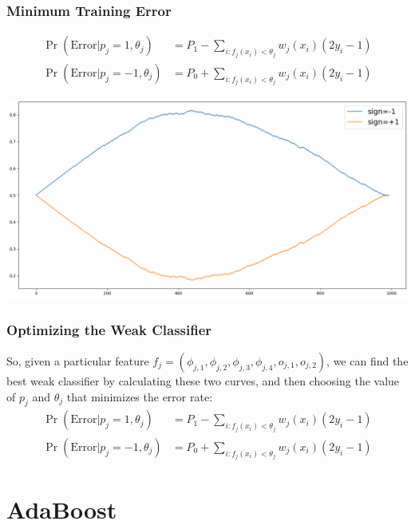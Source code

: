 \documentclass{beamer}
\begin{document}
\begin{frame}
  \frametitle{Minimum Training Error}
  \begin{align*}
    \Pr(\text{Error}|p_j=1,\theta_j) &=P_1-\sum_{i:f_j(x_i)<\theta_j} w_j(x_i)(2y_i-1)\\
    \Pr(\text{Error}|p_j=-1,\theta_j) &=P_0+\sum_{i:f_j(x_i)<\theta_j} w_j(x_i)(2y_i-1)
  \end{align*}
  \centerline{\includegraphics[height=0.5\textheight]{figs/errorplus_errorminus.png}}
\end{frame}

\begin{frame}
  \frametitle{Optimizing the Weak Classifier}

  So, given a particular feature
  $f_j=(\phi_{j,1},\phi_{j,2},\phi_{j,3},\phi_{j,4},o_{j,1},o_{j,2})$,
  we can find the best weak classifier by calculating these two
  curves, and then choosing the value of $p_j$ and $\theta_j$ that
  minimizes the error rate:
  \begin{align*}
    \Pr(\text{Error}|p_j=1,\theta_j) &= P_1-\sum_{i:f_j(x_i)<\theta_j} w_j(x_i)(2y_i-1)\\
    \Pr(\text{Error}|p_j=-1,\theta_j) &= P_0+\sum_{i:f_j(x_i)<\theta_j} w_j(x_i)(2y_i-1)
  \end{align*}
\end{frame}

\section[AdaBoost]{AdaBoost}
\setcounter{subsection}{1}
\end{document}
